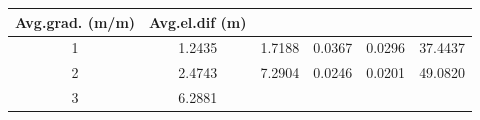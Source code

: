 \documentclass[11pt,]{article}
\begin{document}
\begin{longtable}[]{@{}cccccc@{}}
\begin{minipage}[b]{0.14\columnwidth}
Avg.grad. (m/m)\strut
\end{minipage} & \begin{minipage}[b]{0.13\columnwidth}\centering\strut
Avg.el.dif (m)\strut
\end{minipage}\tabularnewline
\midrule
\endhead
\begin{minipage}[t]{0.08\columnwidth}\centering\strut
1\strut
\end{minipage} & \begin{minipage}[t]{0.11\columnwidth}\centering\strut
1.2435\strut
\end{minipage} & \begin{minipage}[t]{0.25\columnwidth}\centering\strut
1.7188\strut
\end{minipage} & \begin{minipage}[t]{0.11\columnwidth}\centering\strut
0.0367\strut
\end{minipage} & \begin{minipage}[t]{0.14\columnwidth}\centering\strut
0.0296\strut
\end{minipage} & \begin{minipage}[t]{0.13\columnwidth}\centering\strut
37.4437\strut
\end{minipage}\tabularnewline
\begin{minipage}[t]{0.08\columnwidth}\centering\strut
2\strut
\end{minipage} & \begin{minipage}[t]{0.11\columnwidth}\centering\strut
2.4743\strut
\end{minipage} & \begin{minipage}[t]{0.25\columnwidth}\centering\strut
7.2904\strut
\end{minipage} & \begin{minipage}[t]{0.11\columnwidth}\centering\strut
0.0246\strut
\end{minipage} & \begin{minipage}[t]{0.14\columnwidth}\centering\strut
0.0201\strut
\end{minipage} & \begin{minipage}[t]{0.13\columnwidth}\centering\strut
49.0820\strut
\end{minipage}\tabularnewline
\begin{minipage}[t]{0.08\columnwidth}\centering\strut
3\strut
\end{minipage} & \begin{minipage}[t]{0.11\columnwidth}\centering\strut
6.2881\strut
\end{minipage} & \begin{minipage}[t]{0.25\columnwidth}\centering\strut

\end{minipage}
\end{longtable}
\end{document}
